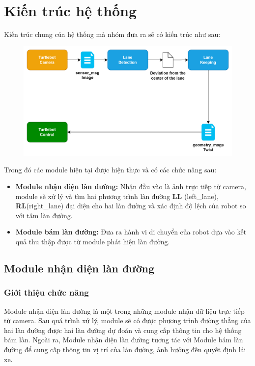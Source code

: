 \chapter{Kiến trúc hệ thống}

Kiến trúc chung của hệ thống mà nhóm đưa ra sẽ có kiến trúc như sau:

\begin{figure}[htp]
    \centering
    \includegraphics[width=\linewidth]{img/3_Architecture/general_arch.png}
\end{figure}

Trong đó các module hiện tại được hiện thực và có các chức năng sau:

\begin{itemize}
    \item \textbf{Module nhận diện làn đường:} Nhận đầu vào là ảnh trực tiếp từ camera, module sẽ xử lý và tìm hai phương trình làn đường \textbf{LL} (left\_lane), \textbf{RL}(right\_lane) đại diện cho hai làn đường và xác định độ lệch của robot so với tâm làn đường.
    \item \textbf{Module bám làn đường:} Đưa ra hành vi di chuyển của robot dựa vào kết quả thu thập được từ module phát hiện làn đường.
\end{itemize}

\section{Module nhận diện làn đường}

\subsection{Giới thiệu chức năng}

Module nhận diện làn đường là một trong những module nhận dữ liệu trực tiếp từ camera. Sau quá trình xử lý, module sẽ có được phương trình đường thẳng của hai làn đường được hai làn đường dự đoán và cung cấp thông tin cho hệ thống bám làn. Ngoài ra, Module nhận diện làn đường tương tác với Module bám làn đường để cung cấp thông tin vị trí của làn đường, ảnh hưởng đến quyết định lái xe.

